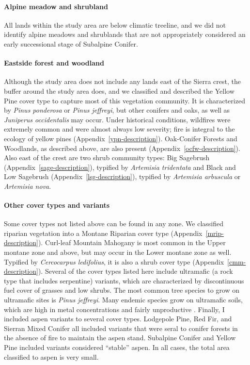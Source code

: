 \paragraph{Alpine meadow and shrubland} All lands within the study area are below climatic treeline, and we did not identify alpine meadows and shrublands that are not appropriately considered an early successional stage of Subalpine Conifer.


\paragraph{Eastside forest and woodland} Although the study area does not include any lands east of the Sierra crest, the buffer around the study area does, and we classified and described the Yellow Pine cover type to capture most of this vegetation community. It is characterized by \emph{Pinus ponderosa} or \emph{Pinus jeffreyi}, but other conifers and oaks, as well as \emph{Juniperus occidentalis} may occur. Under historical conditions, wildfires were extremely common and were almost always low severity; fire is integral to the ecology of yellow pines (Appendix~\ref{ypn-description}). 
%
Oak-Conifer Forests and Woodlands, as described above, are also present (Appendix~\ref{ocfw-description}). 
%
Also east of the crest are two shrub community types: Big Sagebrush (Appendix~\ref{sage-description}), typified by \emph{Artemisia tridentata} and Black and Low Sagebrush (Appendix~\ref{lsg-description}), typified by \emph{Artemisia arbuscula} or \emph{Artemisia nova}. 


\paragraph{Other cover types and variants} Some cover types not listed above can be found in any zone. We classified riparian vegetation into a Montane Riparian cover type (Appendix~\ref{mrip-description}). 
%
Curl-leaf Mountain Mahogany is most common in the Upper montane zone and above, but may occur in the Lower montane zone as well. Typified by \emph{Cercocarpus ledifolius}, it is also a shrub cover type (Appendix~\ref{cmm-description}). 
%
Several of the cover types listed here include ultramafic (a rock type that includes serpentine) variants, which are characterized by discontinuous fuel cover of grasses and low shrubs. The most common tree species to grow on ultramafic sites is \emph{Pinus jeffreyi}. Many endemic species grow on ultramafic soils, which are high in metal concentrations and fairly unproductive \citep{OGeen2007}.
%
Finally, I included aspen variants to several cover types. Lodgepole Pine, Red Fir, and Sierran Mixed Conifer all included variants that were seral to conifer forests in the absence of fire to maintain the aspen stand. Subalpine Conifer and Yellow Pine included variants considered ``stable'' aspen. In all cases, the total area classified to aspen is very small. 

